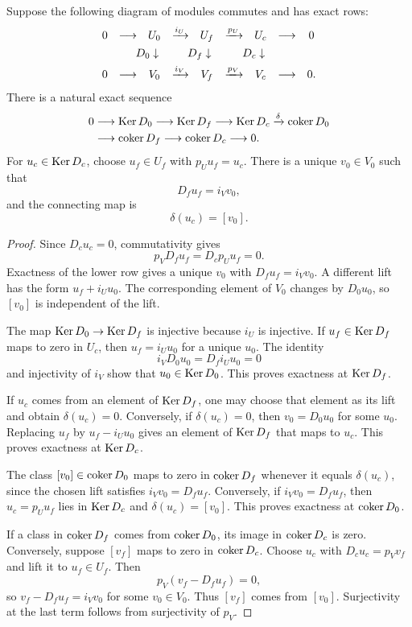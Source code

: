 \begin{theorem}\label{thm:relative_obstruction_sequence}
Suppose the following diagram of modules commutes and has exact rows:
\[
\begin{array}{ccccccccc}
0&\longrightarrow&U_0&\xrightarrow{i_U}&U_f&\xrightarrow{p_U}&U_c&\longrightarrow&0\\[4pt]
&&\mathllap{D_0}\downarrow&&\mathllap{D_f}\downarrow&&\mathllap{D_c}\downarrow&&\\[4pt]
0&\longrightarrow&V_0&\xrightarrow{i_V}&V_f&\xrightarrow{p_V}&V_c&\longrightarrow&0.
\end{array}
\]
There is a natural exact sequence
\[
\begin{aligned}
0&\longrightarrow\operatorname{Ker} D_0
\longrightarrow\operatorname{Ker} D_f
\longrightarrow\operatorname{Ker} D_c
\xrightarrow{\delta}\operatorname{coker} D_0\\
&\longrightarrow\operatorname{coker} D_f
\longrightarrow\operatorname{coker} D_c
\longrightarrow0.
\end{aligned}
\]
For $u_c\in\operatorname{Ker} D_c$, choose $u_f\in U_f$ with $p_Uu_f=u_c$.  There is a unique $v_0\in V_0$ such that
\[
D_fu_f=i_Vv_0,
\]
and the connecting map is
\[
\delta(u_c)=[v_0].
\]
\end{theorem}

\begin{proof}
Since $D_cu_c=0$, commutativity gives
\[
p_VD_fu_f=D_cp_Uu_f=0.
\]
Exactness of the lower row gives a unique $v_0$ with $D_fu_f=i_Vv_0$.  A different lift has the form $u_f+i_Uu_0$.  The corresponding element of $V_0$ changes by $D_0u_0$, so $[v_0]$ is independent of the lift.

The map $\operatorname{Ker} D_0\to\operatorname{Ker} D_f$ is injective because $i_U$ is injective.  If $u_f\in\operatorname{Ker} D_f$ maps to zero in $U_c$, then $u_f=i_Uu_0$ for a unique $u_0$.  The identity
\[
i_VD_0u_0=D_fi_Uu_0=0
\]
and injectivity of $i_V$ show that $u_0\in\operatorname{Ker} D_0$.  This proves exactness at $\operatorname{Ker} D_f$.

If $u_c$ comes from an element of $\operatorname{Ker} D_f$, one may choose that element as its lift and obtain $\delta(u_c)=0$.  Conversely, if $\delta(u_c)=0$, then $v_0=D_0u_0$ for some $u_0$.  Replacing $u_f$ by $u_f-i_Uu_0$ gives an element of $\operatorname{Ker} D_f$ that maps to $u_c$.  This proves exactness at $\operatorname{Ker} D_c$.

The class $[v_0]\in\operatorname{coker} D_0$ maps to zero in $\operatorname{coker} D_f$ whenever it equals $\delta(u_c)$, since the chosen lift satisfies $i_Vv_0=D_fu_f$.  Conversely, if $i_Vv_0=D_fu_f$, then $u_c=p_Uu_f$ lies in $\operatorname{Ker} D_c$ and $\delta(u_c)=[v_0]$.  This proves exactness at $\operatorname{coker} D_0$.

If a class in $\operatorname{coker} D_f$ comes from $\operatorname{coker} D_0$, its image in $\operatorname{coker} D_c$ is zero.  Conversely, suppose $[v_f]$ maps to zero in $\operatorname{coker} D_c$.  Choose $u_c$ with $D_cu_c=p_Vv_f$ and lift it to $u_f\in U_f$.  Then
\[
p_V(v_f-D_fu_f)=0,
\]
so $v_f-D_fu_f=i_Vv_0$ for some $v_0\in V_0$.  Thus $[v_f]$ comes from $[v_0]$.  Surjectivity at the last term follows from surjectivity of $p_V$.
\end{proof}

